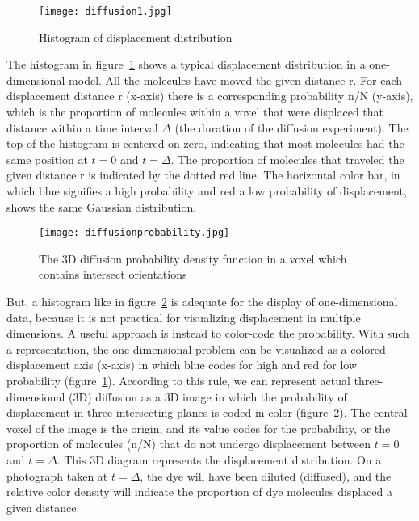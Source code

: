 \begin{figure} 
  \centering 
  \texttt{[image: diffusion1.jpg]}
  \caption{Histogram of displacement distribution}
  \label{Fig:diffusion1}
\end{figure}

The histogram in figure~\ref{Fig:diffusion1} shows a typical displacement distribution in a one-dimensional model. All the molecules have moved the given distance r. For each displacement distance r (x-axis) there is a corresponding probability n/N (y-axis), which is the proportion of molecules within a voxel that were displaced that distance within a time interval $\Delta$ (the duration of the diffusion experiment). The top of the histogram is centered on zero, indicating that most molecules had the same position at $t = 0$ and $t = \Delta$. The proportion of molecules that traveled the given distance r is indicated by the dotted red line. The horizontal color bar, in which blue signifies a high probability and red a low probability of displacement, shows the same Gaussian distribution. 

\begin{figure} 
  \centering 
  \texttt{[image: diffusionprobability.jpg]}
  \caption{The 3D diffusion probability density function in a voxel which contains intersect orientations}
  \label{Fig:diffusion_intersect}
\end{figure}


But, a histogram like in figure~\ref{Fig:diffusion_intersect} is adequate for the display of one-dimensional data, because it is not practical for visualizing displacement in multiple dimensions. A useful approach is instead to color-code the probability. With such a representation, the one-dimensional problem can be visualized as a colored displacement axis (x-axis) in which blue codes for high and red for low probability (figure~\ref{Fig:diffusion1}). According to this rule, we can represent actual three-dimensional (3D) diffusion as a 3D image in which the probability of displacement in three intersecting planes is coded in color (figure~\ref{Fig:diffusion_intersect}). The central voxel of the image is the origin, and its value codes for the probability, or the proportion of molecules (n/N) that do not undergo displacement between $t = 0$ and $t = \Delta$. This 3D diagram represents the displacement distribution. On a photograph taken at $t = \Delta$, the dye will have been diluted (diffused), and the relative color density will indicate the proportion of dye molecules displaced a given distance.

